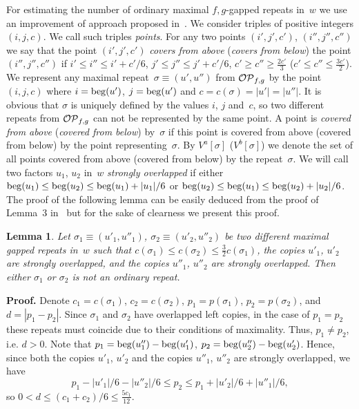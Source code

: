 \documentclass{article}
\newtheorem{lemma}{Lemma}
\begin{document}
For estimating the number of ordinary maximal $f,g$-gapped repeats in~$w$ 
we use an improvement of approach proposed in~\cite{Kolpakov12, forJDA}.
We consider triples of positive integers $(i, j, c)$. We call such triples 
{\it points}. For any two points $(i', j', c')$, $(i'', j'', c'')$ we say 
that the point $(i', j', c')$ {\it covers from above} ({\it covers from below})
the point $(i'', j'', c'')$ if $i'\le i''\le i'+c'/6$, $j'\le j''\le j'+c'/6$, 
$c'\ge c'' \ge \frac{2c'}{3}$ ($c'\le c'' \le \frac{3c'}{2}$). We represent any 
maximal repeat~$\sigma\equiv (u', u'')$  from ${\cal OP}_{f, g}$ by the point 
$(i, j, c)$ where $i={\rm beg} (u')$, $j={\rm beg} (u')$ and $c=c(\sigma)=|u'|=|u''|$.
It is obvious that $\sigma$ is uniquely defined by the values $i$, $j$ and~$c$, 
so two different repeats from ${\cal OP}_{f, g}$ can not be represented by the
same point. A point is {\it covered from above} ({\it covered from below}) by~$\sigma$ 
if this point is covered from above (covered from below) by the point representing~$\sigma$.
By $V^a[\sigma ]$ ($V^b[\sigma ]$) we denote the set of all points covered from above
(covered from below) by the repeat~$\sigma$. We will call two factors $u_1$, $u_2$ in~$w$ 
{\it strongly overlapped} if either ${\rm beg} (u_1)\le {\rm beg} (u_2)\le {\rm beg} (u_1)+|u_1|/6$ 
or ${\rm beg} (u_2)\le {\rm beg} (u_1)\le {\rm beg} (u_2)+|u_2|/6$. The proof of
the following lemma can be easily deduced from the proof of Lemma~3 in~\cite{LATA16}
but for the sake of clearness we present this proof.

\begin{lemma}
Let $\sigma_1\equiv (u'_1, u''_1)$, $\sigma_2\equiv (u'_2, u''_2)$ be two different 
maximal gapped repeats in~$w$ such that $c(\sigma_1)\le c(\sigma_2)\le\frac{3}{2}c(\sigma_1)$,
the copies $u'_1$, $u'_2$ are strongly overlapped, and the copies $u''_1$, $u''_2$ 
are strongly overlapped. Then either $\sigma_1$ or $\sigma_2$ is not an ordinary repeat.
\label{tehlemma}
\end{lemma}

{\bf Proof.} Denote $c_1=c(\sigma_1)$, $c_2=c(\sigma_2)$, $p_1=p(\sigma_1)$,
$p_2=p(\sigma_2)$, and $d=|p_1-p_2|$. Since $\sigma_1$ and $\sigma_2$ have
overlapped left copies, in the case of $p_1=p_2$ these repeats must coincide 
due to their conditions of maximality. Thus, $p_1\neq p_2$, i.e. $d>0$. Note 
that $p_1={\rm beg}(u''_1)-{\rm beg}(u'_1)$, $p_2={\rm beg}(u''_2)-{\rm beg}(u'_2)$. 
Hence, since both the copies $u'_1$, $u'_2$ and the copies $u''_1$, $u''_2$ are 
strongly overlapped, we have
$$
p_1-|u'_1|/6-|u''_2|/6\le p_2\le p_1+|u'_2|/6+|u''_1|/6,
$$
so $0<d\le (c_1+c_2)/6\le\frac{5c_1}{12}$.
\end{document}
